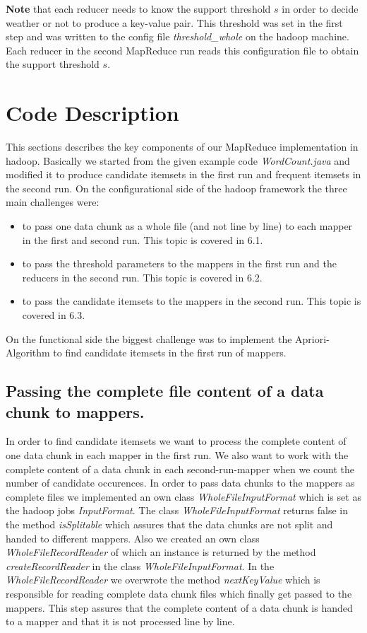 \documentclass[a4paper,ngerman]{scrartcl}
\begin{document}
\textbf{Note} that each reducer needs to know the support threshold $s$ in order to decide weather or not to produce a key-value pair. This threshold was set in the first step and was written to the config file \textit{threshold\_whole} on the hadoop machine. Each reducer in the second MapReduce run reads this configuration file to obtain the support threshold $s$.

\section{Code Description}

This sections describes the key components of our MapReduce implementation in hadoop. Basically we started from the given example code \textit{WordCount.java} and modified it to produce candidate itemsets in the first run and frequent itemsets in the second run. 
On the configurational side of the hadoop framework the three main challenges were:
\begin{itemize}
\item to pass one data chunk as a whole file (and not line by line) to each mapper in the first and second run. This topic is covered in 6.1.
\item to pass the threshold parameters to the mappers in the first run and the reducers in the second run. This topic is covered in 6.2.
\item to pass the candidate itemsets to the mappers in the second run. This topic is covered in 6.3.
\end{itemize}
On the functional side the biggest challenge was to implement the Apriori-Algorithm to find candidate itemsets in the first run of mappers. 
\subsection{Passing the complete file content of a data chunk to mappers.}
In order to find candidate itemsets we want to process the complete content of one data chunk in each mapper in the first run. We also want to work with the complete content of a data chunk in each second-run-mapper when we count the number of candidate occurences. In order to pass data chunks to the mappers as complete files we implemented an own class \textit{WholeFileInputFormat} which is set as the hadoop jobs \textit{InputFormat}. The class \textit{WholeFileInputFormat} returns false in the method \textit{isSplitable} which assures that the data chunks are not split and handed to different mappers. Also we created an own class \textit{WholeFileRecordReader} of which an instance is returned by the method \textit{createRecordReader} in the class \textit{WholeFileInputFormat}. In the \textit{WholeFileRecordReader} we overwrote the method \textit{nextKeyValue} which is responsible for reading  complete data chunk files which finally get passed to the mappers. This step assures that the complete content of a data chunk is handed to a mapper and that it is not processed line by line.
\end{document}
